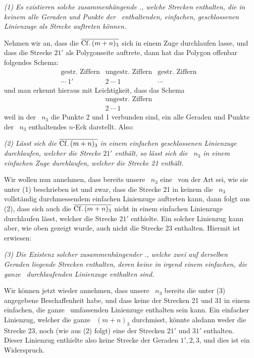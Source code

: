 \documentclass[11pt,a4paper]{article}
\begin{document}
\emph{(1) Es existieren solche zusammenhängende \Cff., welche Strecken enthalten, die in keinem alle Geraden und Punkte der \Cf\ enthaltenden, einfachen, geschlossenen Linienzuge als Strecke auftreten können.}

Nehmen wir an, dass die $\overline{\mathrm{Cf.}\,(m+n)_3}$ sich in einem Zuge durchlaufen lasse, und dass die Strecke $21'$ als Polygonseite auftrete, dann hat das Polygon offenbar folgendes Schema:
\[
\begin{array}{ccc}
\text{gestr. Ziffern} & \text{ungestr. Ziffern} & \text{gestr. Ziffern}\\
\cdots\ 1' & 2\ \cdots\ 1 & \cdots
\end{array}
\]
und man erkennt hieraus mit Leichtigkeit, dass das Schema
\[
\begin{array}{c}
\text{ungestr. Ziffern}\\
2\ \cdots\ 1
\end{array}
\]
weil in der \Cf\ $n_3$ die Punkte 2 und 1 verbunden sind, ein alle Geraden und Punkte der \Cf\ $n_3$ enthaltendes $n$-Eck darstellt. Also:

\emph{(2) Lässt sich die $\overline{\mathrm{Cf.}\,(m+n)_3}$ in einem einfachen geschlossenen Linienzuge durchlaufen, welcher die Strecke $21'$ enthält, so lässt sich die \Cf\ $n_3$ in einem einfachen Zuge durchlaufen, welcher die Strecke 21 enthält.}

Wir wollen nun annehmen, dass bereits unsere \Cf\ $n_3$ eine \Cf\ von der Art sei, wie sie unter (1) beschrieben ist und zwar, dass die Strecke 21 in keinem die \Cf\ $n_3$ vollständig durchmessendem einfachen Linienzuge auftreten kann, dann folgt aus (2), dass sich auch die $\overline{\mathrm{Cf.}\,(m+n)_3}$ nicht in einem einfachen Linienzuge durchlaufen lässt, welcher die Strecke $21'$ enthielte. Ein solcher Linienzug kann aber, wie oben gezeigt wurde, auch nicht die Strecke 23 enthalten. Hiermit ist erwiesen:

\emph{(3) Die Existenz solcher zusammenhängender \Cff., welche zwei auf derselben Geraden liegende Strecken enthalten, deren keine in irgend einem einfachen, die ganze \Cf\ durchlaufenden Linienzuge enthalten sind.}

Wir können jetzt wieder annehmen, dass unsere \Cf\ $n_3$ bereits die unter (3) angegebene Beschaffenheit habe, und dass keine der Strecken 21 und 31 in einem einfachen, die ganze \Cf\ umfassenden Linienzuge enthalten sein kann. Ein einfacher Linienzug, welcher die ganze \Cf\ $(m+n)_3$ durchmisst, könnte alsdann weder die Strecke 23, noch (wie aus (2) folgt) eine der Strecken $21'$ und $31'$ enthalten. Dieser Linienzug enthielte also keine Strecke der Geraden $1',2,3$, und dies ist ein Widerspruch.
\end{document}
